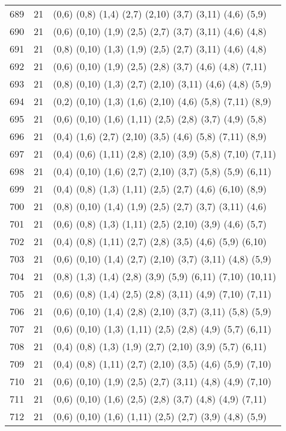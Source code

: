 {\begin{longtable}{lll}
689 & 21 & (0,6) (0,8) (1,4) (2,7) (2,10) (3,7) (3,11) (4,6) (5,9) \\
690 & 21 & (0,6) (0,10) (1,9) (2,5) (2,7) (3,7) (3,11) (4,6) (4,8) \\
691 & 21 & (0,8) (0,10) (1,3) (1,9) (2,5) (2,7) (3,11) (4,6) (4,8) \\
692 & 21 & (0,6) (0,10) (1,9) (2,5) (2,8) (3,7) (4,6) (4,8) (7,11) \\
693 & 21 & (0,8) (0,10) (1,3) (2,7) (2,10) (3,11) (4,6) (4,8) (5,9) \\
694 & 21 & (0,2) (0,10) (1,3) (1,6) (2,10) (4,6) (5,8) (7,11) (8,9) \\
695 & 21 & (0,6) (0,10) (1,6) (1,11) (2,5) (2,8) (3,7) (4,9) (5,8) \\
696 & 21 & (0,4) (1,6) (2,7) (2,10) (3,5) (4,6) (5,8) (7,11) (8,9) \\
697 & 21 & (0,4) (0,6) (1,11) (2,8) (2,10) (3,9) (5,8) (7,10) (7,11) \\
698 & 21 & (0,4) (0,10) (1,6) (2,7) (2,10) (3,7) (5,8) (5,9) (6,11) \\
699 & 21 & (0,4) (0,8) (1,3) (1,11) (2,5) (2,7) (4,6) (6,10) (8,9) \\
700 & 21 & (0,8) (0,10) (1,4) (1,9) (2,5) (2,7) (3,7) (3,11) (4,6) \\
701 & 21 & (0,6) (0,8) (1,3) (1,11) (2,5) (2,10) (3,9) (4,6) (5,7) \\
702 & 21 & (0,4) (0,8) (1,11) (2,7) (2,8) (3,5) (4,6) (5,9) (6,10) \\
703 & 21 & (0,6) (0,10) (1,4) (2,7) (2,10) (3,7) (3,11) (4,8) (5,9) \\
704 & 21 & (0,8) (1,3) (1,4) (2,8) (3,9) (5,9) (6,11) (7,10) (10,11) \\
705 & 21 & (0,6) (0,8) (1,4) (2,5) (2,8) (3,11) (4,9) (7,10) (7,11) \\
706 & 21 & (0,6) (0,10) (1,4) (2,8) (2,10) (3,7) (3,11) (5,8) (5,9) \\
707 & 21 & (0,6) (0,10) (1,3) (1,11) (2,5) (2,8) (4,9) (5,7) (6,11) \\
708 & 21 & (0,4) (0,8) (1,3) (1,9) (2,7) (2,10) (3,9) (5,7) (6,11) \\
709 & 21 & (0,4) (0,8) (1,11) (2,7) (2,10) (3,5) (4,6) (5,9) (7,10) \\
710 & 21 & (0,6) (0,10) (1,9) (2,5) (2,7) (3,11) (4,8) (4,9) (7,10) \\
711 & 21 & (0,6) (0,10) (1,6) (2,5) (2,8) (3,7) (4,8) (4,9) (7,11) \\
712 & 21 & (0,6) (0,10) (1,6) (1,11) (2,5) (2,7) (3,9) (4,8) (5,9) \\

\end{longtable}}
